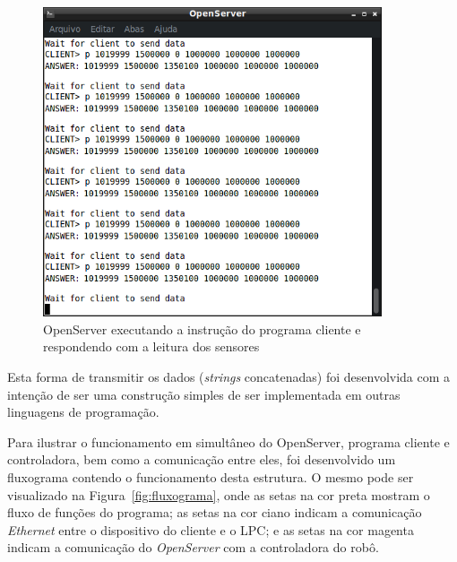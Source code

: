             \begin{figure}[ht]
                \centering
                \includegraphics[width=10cm]{imagens/Softwares/openserver-send_.png}
                \small 
                \centering 
                \caption{OpenServer executando a instrução do programa cliente e respondendo com a leitura dos sensores}
                \label{openserver-send}
            \end{figure}
            
            Esta forma de transmitir os dados (\textit{strings} concatenadas) foi desenvolvida com a intenção de ser uma construção simples de ser implementada em outras linguagens de programação.
            
            Para ilustrar o funcionamento em simultâneo do OpenServer, programa cliente e controladora, bem como a comunicação entre eles, foi desenvolvido um fluxograma contendo o funcionamento desta estrutura. O mesmo pode ser visualizado na Figura~\ref{fig:fluxograma}, onde as setas na cor preta mostram o fluxo de funções do programa; as setas na cor ciano indicam a comunicação \textit{Ethernet} entre o dispositivo do cliente e o \ac{LPC}; e as setas na cor magenta indicam a comunicação do \textit{OpenServer} com a controladora do robô.
            
